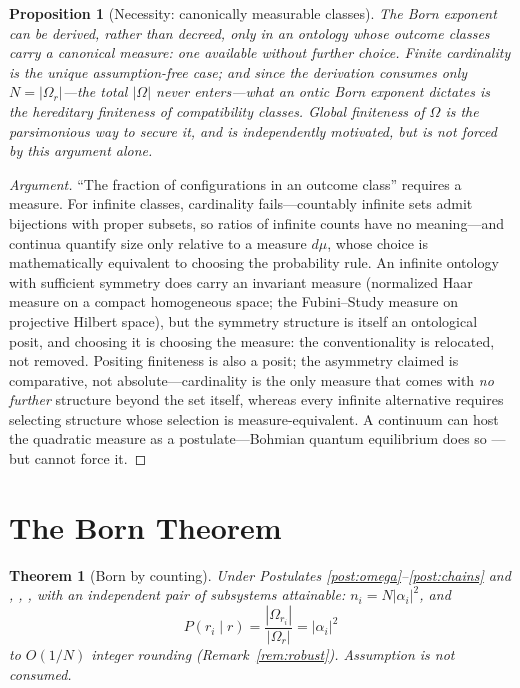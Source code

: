 \documentclass[11pt]{article}
\newtheorem{theorem}{Theorem}
\newtheorem{proposition}{Proposition}
\theoremstyle{definition}
\theoremstyle{remark}
\begin{document}
\begin{proposition}[Necessity: canonically measurable classes]\label{prop:necessity}
The Born exponent can be derived, rather than decreed, only in an ontology whose outcome classes carry a canonical measure: one available without further choice. Finite cardinality is the unique assumption-free case; and since the derivation consumes only $N = |\Omega_r|$---the total $|\Omega|$ never enters---what an ontic Born exponent dictates is the hereditary finiteness of compatibility classes. Global finiteness of $\Omega$ is the parsimonious way to secure it, and is independently motivated, but is not forced by this argument alone.
\end{proposition}
\begin{proof}[Argument]
``The fraction of configurations in an outcome class'' requires a measure. For infinite classes, cardinality fails---countably infinite sets admit bijections with proper subsets, so ratios of infinite counts have no meaning---and continua quantify size only relative to a measure $d\mu$, whose choice is mathematically equivalent to choosing the probability rule. An infinite ontology with sufficient symmetry does carry an invariant measure (normalized Haar measure on a compact homogeneous space; the Fubini--Study measure on projective Hilbert space), but the symmetry structure is itself an ontological posit, and choosing it is choosing the measure: the conventionality is relocated, not removed. Positing finiteness is also a posit; the asymmetry claimed is comparative, not absolute---cardinality is the only measure that comes with \emph{no further} structure beyond the set itself, whereas every infinite alternative requires selecting structure whose selection is measure-equivalent. A continuum can host the quadratic measure as a postulate---Bohmian quantum equilibrium does so \cite{Durr1992}---but cannot force it.
\end{proof}

\section{The Born Theorem}\label{sec:born}

\begin{theorem}[Born by counting]\label{thm:born}
Under Postulates \ref{post:omega}--\ref{post:chains} and {\upshape[AS]}, {\upshape[LC]}, {\upshape[PR]}, with an independent pair of subsystems attainable: $n_i = N |\alpha_i|^2$, and
\[ P(r_i \mid r) = \frac{|\Omega_{r_i}|}{|\Omega_r|} = |\alpha_i|^2 \]
to $O(1/N)$ integer rounding (Remark~\ref{rem:robust}). Assumption {\upshape[T]} is not consumed.
\end{theorem}
\end{document}

